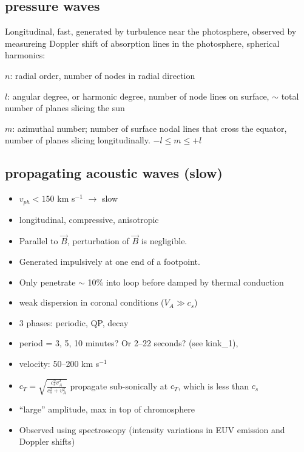 \documentclass[12pt]{article}
\begin{document}
\subsection*{pressure waves}
Longitudinal, fast, generated by turbulence near the photosphere,
observed by measureing Doppler shift of absorption lines in the
photosphere, spherical harmonics:
\begin{itemize*}
    \item $n$: radial order, number of nodes in radial direction
    \item $l$: angular degree, or harmonic degree,
        number of node lines on surface,
        $\sim$ total number of planes slicing the sun
    \item $m$: azimuthal number;
        number of surface nodal lines that cross the equator,
        number of planes slicing longitudinally. $-l\leq m\leq +l$
\end{itemize*}

\subsection*{propagating acoustic waves (slow)}
\begin{itemize}
    \item $v_{ph}<150$ km s$^{-1}$ $\rightarrow$ slow
    \item longitudinal, compressive, anisotropic
    \item Parallel to $\vec{B}$, perturbation of $\vec{B}$ is negligible.
    \item Generated impulsively at one end of a footpoint.
    \item Only penetrate $\sim$ 10\% into loop before
        damped by thermal conduction
    \item weak dispersion in coronal conditions ($V_{A} \gg c_{s}$)
    \item 3 phases: periodic, QP, decay
    \item period = 3, 5, 10 minutes? Or 2--22 seconds? (see kink\_1),
    \item velocity: 50--200 km s$^{-1}$
    \item $c_{T} = \sqrt{\frac{c_{s}^2v_{A}^2}{c_{s}^2 + v_{A}^2}} $
        propagate sub-sonically at $c_{T}$, which is less than $c_{s}$
    \item ``large'' amplitude, max in top of chromosphere
    \item Observed using spectroscopy (intensity variations in
        EUV emission  and Doppler shifts)
\end{itemize}
\end{document}
